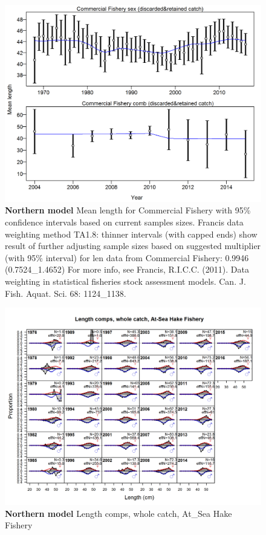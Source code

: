\documentclass[12pt,]{article}
\begin{document}
\begin{figure}[htbp]
\centering
\includegraphics{./tex2pdf.8516/134fba6e611f1b7b471828c86599d6b35bfa09c1.png}
\caption{\textbf{Northern model} Mean length for Commercial Fishery with
95\% confidence intervals based on current samples sizes. Francis data
weighting method TA1.8: thinner intervals (with capped ends) show result
of further adjusting sample sizes based on suggested multiplier (with
95\% interval) for len data from Commercial Fishery: 0.9946
(0.7524\_1.4652) For more info, see Francis, R.I.C.C. (2011). Data
weighting in statistical fisheries stock assessment models. Can. J.
Fish. Aquat. Sci. 68: 1124\_1138.
\label{fig:mod1_9_comp_lenfit_data_weighting_TA1.8_Commercial Fishery}}
\end{figure}

\begin{figure}[htbp]
\centering
\includegraphics{./r4ss/plots_mod1/comp_lenfit_flt2mkt0.png}
\caption{\textbf{Northern model} Length comps, whole catch, At\_Sea Hake
Fishery \label{fig:mod1_10_comp_lenfit_flt2mkt0}}
\end{figure}
\end{document}
